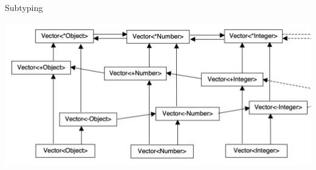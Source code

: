 \documentclass[usenames,dvipsnames]{beamer}
\begin{document}
\begin{frame}[fragile]{Subtyping}
\begin{center}
  \subt {} \subt {}

\vspace*{0.5cm}
\includegraphics[scale=0.28]{img/subtype}
\end{center}

\end{frame}
\end{document}
